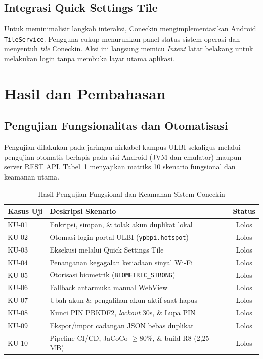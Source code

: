 \documentclass[10pt,journal,compsoc]{IEEEtran}
\begin{document}
\subsection{Integrasi Quick Settings Tile}
Untuk meminimalisir langkah interaksi, Coneckin mengimplementasikan Android \texttt{TileService}. Pengguna cukup menurunkan panel status sistem operasi dan menyentuh \textit{tile} Coneckin. Aksi ini langsung memicu \textit{Intent} latar belakang untuk melakukan login tanpa membuka layar utama aplikasi.

\section{Hasil dan Pembahasan}

\subsection{Pengujian Fungsionalitas dan Otomatisasi}
Pengujian dilakukan pada jaringan nirkabel kampus ULBI sekaligus melalui pengujian otomatis berlapis pada sisi Android (JVM dan emulator) maupun server REST API. Tabel~\ref{tab:evaluasi} menyajikan matriks 10 skenario fungsional dan keamanan utama.

\begin{table}[htbp]
\caption{Hasil Pengujian Fungsional dan Keamanan Sistem Coneckin}
\label{tab:evaluasi}
\centering
\begin{tabularx}{\columnwidth}{|l|X|c|}
\hline
\textbf{Kasus Uji} & \textbf{Deskripsi Skenario} & \textbf{Status} \\ \hline
KU-01 & Enkripsi, simpan, \& tolak akun duplikat lokal & Lolos \\ \hline
KU-02 & Otomasi login portal ULBI (\texttt{ypbpi.hotspot}) & Lolos \\ \hline
KU-03 & Eksekusi melalui Quick Settings Tile & Lolos \\ \hline
KU-04 & Penanganan kegagalan ketiadaan sinyal Wi-Fi & Lolos \\ \hline
KU-05 & Otorisasi biometrik (\texttt{BIOMETRIC\_STRONG}) & Lolos \\ \hline
KU-06 & Fallback antarmuka manual WebView & Lolos \\ \hline
KU-07 & Ubah akun \& pengalihan akun aktif saat hapus & Lolos \\ \hline
KU-08 & Kunci PIN PBKDF2, \textit{lockout} 30s, \& Lupa PIN & Lolos \\ \hline
KU-09 & Ekspor/impor cadangan JSON bebas duplikat & Lolos \\ \hline
KU-10 & Pipeline CI/CD, JaCoCo $\ge 80\%$, \& build R8 (2,25 MB) & Lolos \\ \hline
\end{tabularx}
\end{table}
\end{document}
